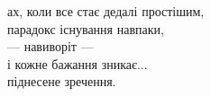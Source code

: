 ах, коли все стає дедалі простішим,\\
парадокс існування навпаки,\\
--- навиворіт ---\\
і кожне бажання зникає...\\
піднесене зречення.
